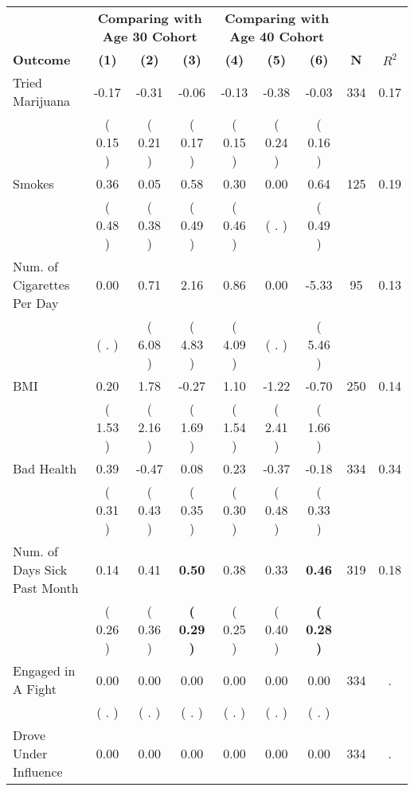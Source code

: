 \begin{tabular}{lcccccccc}
\toprule
 & \multicolumn{3}{c}{\textbf{Comparing with Age 30 Cohort}} & \multicolumn{3}{c}{\textbf{Comparing with Age 40 Cohort}} & \\
\cmidrule(lr){2-4} \cmidrule(lr){5-7} 
 \textbf{Outcome} & \textbf{(1)} & \textbf{(2)} & \textbf{(3)} & \textbf{(4)} & \textbf{(5)} & \textbf{(6)} & \textbf{N} & \textbf{$ R^2$} \\
\midrule
Tried Marijuana &     -0.17 &     -0.31 &     -0.06 &     -0.13 &     -0.38 &     -0.03 & 334 &       0.17 \\ 
 & (     0.15 ) & (     0.21 ) & (     0.17 ) & (     0.15 ) & (     0.24 ) & (     0.16 ) & \\
Smokes &      0.36 &      0.05 &      0.58 &      0.30 &      0.00 &      0.64 & 125 &       0.19 \\ 
 & (     0.48 ) & (     0.38 ) & (     0.49 ) & (     0.46 ) & (        . ) & (     0.49 ) & \\
Num. of Cigarettes Per Day &      0.00 &      0.71 &      2.16 &      0.86 &      0.00 &     -5.33 & 95 &       0.13 \\ 
 & (        . ) & (     6.08 ) & (     4.83 ) & (     4.09 ) & (        . ) & (     5.46 ) & \\
BMI &      0.20 &      1.78 &     -0.27 &      1.10 &     -1.22 &     -0.70 & 250 &       0.14 \\ 
 & (     1.53 ) & (     2.16 ) & (     1.69 ) & (     1.54 ) & (     2.41 ) & (     1.66 ) & \\
Bad Health &      0.39 &     -0.47 &      0.08 &      0.23 &     -0.37 &     -0.18 & 334 &       0.34 \\ 
 & (     0.31 ) & (     0.43 ) & (     0.35 ) & (     0.30 ) & (     0.48 ) & (     0.33 ) & \\
Num. of Days Sick Past Month &      0.14 &      0.41 & \textbf{     0.50} &      0.38 &      0.33 & \textbf{     0.46} & 319 &       0.18 \\ 
 & (     0.26 ) & (     0.36 ) & \textbf{(     0.29 )} & (     0.25 ) & (     0.40 ) & \textbf{(     0.28 )} & \\
Engaged in A Fight &      0.00 &      0.00 &      0.00 &      0.00 &      0.00 &      0.00 & 334 &          . \\ 
 & (        . ) & (        . ) & (        . ) & (        . ) & (        . ) & (        . ) & \\
Drove Under Influence &      0.00 &      0.00 &      0.00 &      0.00 &      0.00 &      0.00 & 334 &          . \\ 

\end{tabular}
